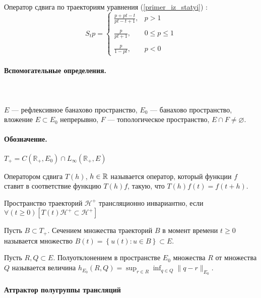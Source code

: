 Оператор сдвига по траекториям уравнения (\ref{primer_iz_statyi}) :
\begin{equation}\label{oper_sdviga_primer_1}
	S_t p =
	\left\{
		\begin{array}{ll}
			\frac{p+pt-t}{pt-t+1}, & p > 1
		\\\\
			\frac{p}{pt+1},        & 0 \leq p \leq 1
		\\\\
			\frac{p}{1 - pt},      & p < 0
		\end{array}
	\right.
\end{equation}


\paragraph{Вспомогательные определения.}
\paragraph{~}
$E$ --- рефлексивное банахово пространство, $E_0$ --- банахово пространство, вложение $E \subset E_0$ непрерывно,
$F$ --- топологическое пространство, $E \cap F \ne \varnothing$.

\paragraph{Обозначение.}
$T_+ = C(\mathbb{R}_+,E_0) \cap L_\infty(\mathbb{R}_+,E)$

\opred
Оператором сдвига $T(h)$, $h\in\mathbb{R}$ называется оператор, который функции $f$ ставит в соответствие функцию $T(h)f$, такую, что
$
T(h)f(t)=f(t+h)
$.

\opred
Пространство траекторий $\mathcal{H}^+$ трансляционно инвариантно, если
$
	\forall(t \geq 0)\left[T(t)\mathcal{H}^+ \subset \mathcal{H}^+ \right]
$

\opred

Пусть $B \subset T_+$.
Сечением множества траекторий $B$ в момент времени $t \geq 0$ называется множество
$
	B(t)=\left\{u(t) : u \in B \right\} \subset E.
$


\opred

Пусть $R,Q \subset E$.
Полуотклонением в пространстве $E_0$ множества $R$ от множества $Q$ называется величина
$
	h_{E_0}(R,Q) = \sup_{r\in R} \inf_{q \in Q} \| q - r \|_{E_0}.
$


\paragraph{Аттрактор полугруппы трансляций}

